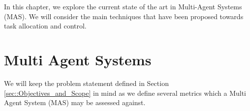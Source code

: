 \documentclass[.../main.tex]{subfiles}
\begin{document}
In this chapter, we explore the current state of the art in
Multi-Agent Systems (MAS). We will consider the main techniques that
have been proposed towards task allocation and control.


\section{Multi Agent Systems} \label{sec::Multi_Agent_Systems}


We will keep the problem statement defined in Section \ref{sec::Objectives_and_Scope} in mind as
we define several metrics which a Multi Agent System (MAS) may be assessed against.
\end{document}

